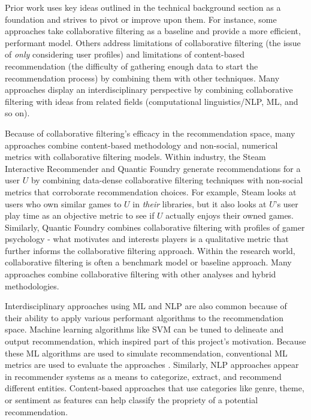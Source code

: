 \documentclass[10pt,twocolumn]{article}
\begin{document}
Prior work uses key ideas outlined in the technical background section as a foundation and strives to pivot or improve upon them. For instance, some approaches take collaborative filtering as a baseline and provide a more efficient, performant model. Others address limitations of collaborative filtering (the issue of \textit{only} considering user profiles) and limitations of content-based recommendation (the difficulty of gathering enough data to start the recommendation process) by combining them with other techniques. Many approaches display an interdisciplinary perspective by combining collaborative filtering with ideas from related fields (computational linguistics/NLP, ML, and so on).

Because of collaborative filtering's efficacy in the recommendation space, many approaches combine content-based methodology and non-social, numerical metrics with collaborative filtering models. Within industry, the Steam Interactive Recommender and Quantic Foundry \cite{SteamInteractiveRecommender, QuanticFoundryRecommender} generate
recommendations for a user $U$ by combining data-dense collaborative filtering techniques with non-social metrics that corroborate recommendation choices. For example, Steam looks at users who own similar games to $U$ in \textit{their} libraries, but it also looks at $U$'s user play time as an objective metric to see if $U$ actually enjoys their owned games. Similarly, Quantic Foundry combines collaborative filtering with profiles of gamer psychology - what motivates and interests players is a qualitative metric that further informs the collaborative filtering approach. Within the research world, collaborative filtering is often a benchmark model or baseline approach. Many approaches combine collaborative filtering with other analyses and hybrid methodologies. \cite{Choi, Gohari, PerezMarcos}

Interdisciplinary approaches using ML and NLP are also common because of their ability to apply various performant algorithms to the recommendation space. Machine learning algorithms like SVM can be tuned to delineate and output recommendation, which inspired part of this project's motivation. \cite{XuAraki} Because these ML algorithms are used to simulate recommendation, conventional ML metrics are used to evaluate the approaches \cite{Nawrocka, Chowdhury, Sujatha}. Similarly, NLP approaches appear in recommender systems as a means to categorize, extract, and recommend different entities. Content-based approaches that use categories like genre, theme, or sentiment as features can help classify the propriety of a potential recommendation. \cite{Berbatova, Asani}
\end{document}
